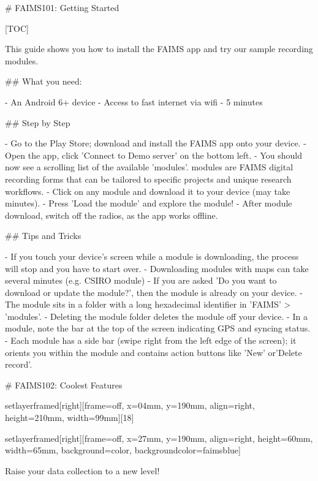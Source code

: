 
# FAIMS101: Getting Started

[TOC]

This guide shows you how to install the FAIMS app and try our sample recording modules.

## What you need:

-  An Android 6+ device
-  Access to fast internet via wifi
-  5 minutes



## Step by Step



-  Go to the Play Store; download and install the FAIMS app onto your device.
-  Open the app, click 'Connect to Demo server' on the bottom left.
-  You should now see a scrolling list of the available 'modules'. modules are FAIMS digital recording forms that can be tailored to specific projects and unique research workflows.
-  Click on any module and download it to your device (may take minutes).
-  Press 'Load the module' and explore the module!
-  After module download, switch off the radios, as the app works offline.







## Tips and Tricks



-  If you touch your device’s screen while a module is downloading, the process will stop and you have to start over.
-  Downloading modules with maps can take several minutes (e.g. CSIRO module)
-  If you are asked 'Do you want to download or update the module?', then the module is already on your device.
-  The module sits in a folder with a long hexadecimal identifier in 'FAIMS' > 'modules'.
-  Deleting the module folder deletes the module off your device.
-  In a module, note the bar at the top of the screen indicating GPS and syncing status.
-  Each module has a side bar (swipe right from the left edge of the screen); it orients you within the module and contains action buttons like 'New' or'Delete record'.



# FAIMS102: Coolest Features


setlayerframed[right][frame=off, x=04mm, y=190mm, align=right, height=210mm, width=99mm][18]


setlayerframed[right][frame=off, x=27mm, y=190mm, align=right, height=60mm, width=65mm, background=color, backgroundcolor=faimsblue]

Raise your data collection to a new level!

